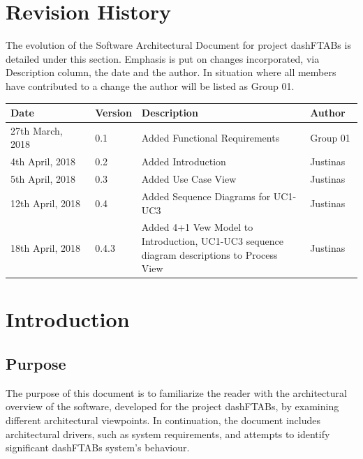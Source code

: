 \documentclass[12pt]{article}
\begin{document}
\section{Revision History}
The evolution of the Software Architectural Document for project dashFTABs is detailed under this section. Emphasis is put on changes incorporated, via Description column, the date and the author. In situation where all members have contributed to a change the author will be listed as Group 01.
\begin{longtable}{ | p{0.25\linewidth} | p{0.1\linewidth} | p{0.5\linewidth} | p{0.15\linewidth} | }\hline 
    Date & Version & Description & Author \\ \hline
   	27th March, 2018 & 0.1 & Added Functional Requirements & Group 01\\ \hline
   	4th April, 2018 & 0.2 & Added Introduction & Justinas\\ \hline
   	5th April, 2018 & 0.3 & Added Use Case View & Justinas\\ \hline
   	12th April, 2018 & 0.4 & Added Sequence Diagrams for UC1-UC3 & Justinas\\ \hline
    18th April, 2018 & 0.4.3 & Added 4+1 Vew Model to Introduction, UC1-UC3 sequence diagram descriptions to Process View & Justinas\\ \hline
\end{longtable}
\pagebreak

\section{Introduction}
\subsection{Purpose}
The purpose of this document is to familiarize the reader with the architectural overview of the software, developed for the project dashFTABs, by examining different architectural viewpoints. In continuation, the document includes architectural drivers, such as system requirements, and attempts to identify significant dashFTABs system’s behaviour.\par
\end{document}

